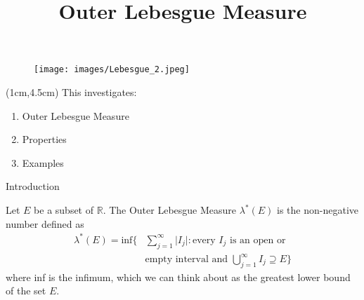 \documentclass{beamer}
\title{Outer Lebesgue Measure}
\author{}
\date{}
\begin{document}
\begin{frame}
    \titlepage 
    
    \begin{wrapfigure}{r}{0.25\textwidth}
    \centering
    \texttt{[image: images/Lebesgue\_2.jpeg]}
    
    
\end{wrapfigure}
\begin{textblock*}{10cm}(1cm,4.5cm)
This investigates:
\begin{enumerate}
        \item Outer Lebesgue Measure
        \item Properties
        \item Examples 
    \end{enumerate}
\end{textblock*}    
\end{frame}

\logo{}


\begin{frame}{Introduction}
\begin{definition}
Let $E$ be a subset of $\mathbb{R}$. The Outer Lebesgue Measure $\lambda^{*}(E)$ is the non-negative number defined as 
\begin{align*}
\lambda^{*}(E)=\text{inf}\big\{&\sum_{j=1}^{\infty}\vert I_{j}\vert:\text{every } I_{j} \text{ is an open or} \\ & \text{empty interval and } \bigcup_{j=1}^{\infty}I_{j}\supseteq E\big\}
\end{align*}
where inf is the infimum, which we can think about as the greatest lower bound of the set $E$.
\end{definition}
\end{frame}


\end{document}
